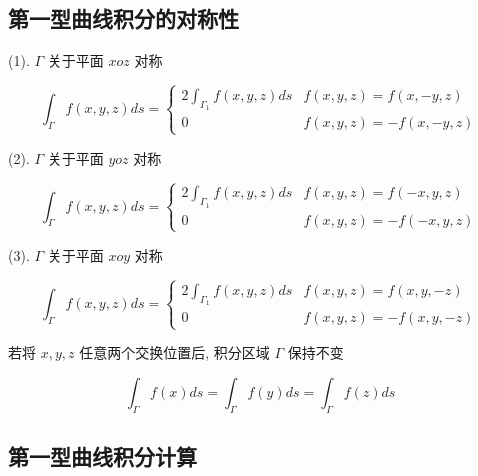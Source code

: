 \subsection{第一型曲线积分的对称性}

\begin{definition}[普通对称性]
	(1). $\Gamma$ 关于平面 $xoz$ 对称

	$$\int_{\Gamma}f(x,y,z)ds = 
	\begin{cases}
		2\int_{\Gamma_{1}}f(x,y,z)ds & f(x,y,z) = f(x,-y,z)\\
		0                                     & f(x,y,z) = -f(x,-y,z)
	\end{cases}$$

	(2). $\Gamma$ 关于平面 $yoz$ 对称

	$$\int_{\Gamma}f(x,y,z)ds =
	\begin{cases}
		2\int_{\Gamma_{1}}f(x,y,z)ds & f(x,y,z) = f(-x,y,z)\\
		0                                     & f(x,y,z) = -f(-x,y,z)
	\end{cases}$$

	(3). $\Gamma$ 关于平面 $xoy$ 对称

	$$\int_{\Gamma}f(x,y,z)ds =
	\begin{cases}
		2\int_{\Gamma_{1}}f(x,y,z)ds & f(x,y,z) = f(x,y,-z)\\
		0                                     & f(x,y,z) = -f(x,y,-z)
	\end{cases}$$
\end{definition}

\begin{definition}[轮换对称性]
	若将 $x,y,z$ 任意两个交换位置后, 积分区域 $\Gamma$ 保持不变

	$$\int_{\Gamma}f(x)ds=\int_{\Gamma}f(y)ds=\int_{\Gamma}f(z)ds$$
\end{definition}

\subsection{第一型曲线积分计算}

